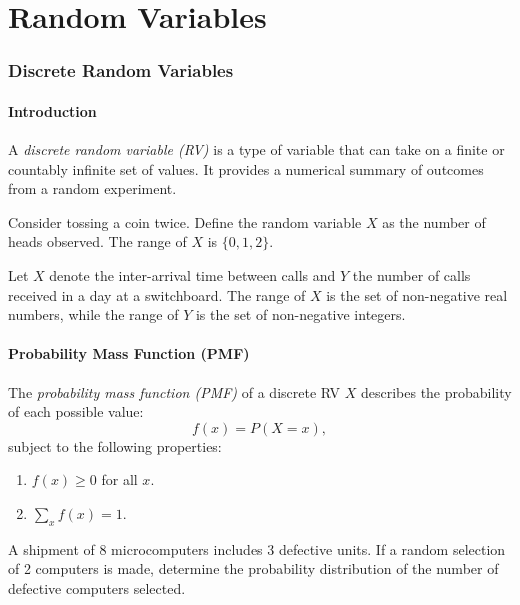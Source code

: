 \documentclass{article}
\begin{document}
\part{Random Variables}

\section{Discrete Random Variables}

\subsection{Introduction}
A \textit{discrete random variable (RV)} is a type of variable that can take on a finite or countably infinite set of values. It provides a numerical summary of outcomes from a random experiment.

\begin{example}
Consider tossing a coin twice. Define the random variable $X$ as the number of heads observed. The range of $X$ is $\{0, 1, 2\}$.
\end{example}

\begin{example}
Let $X$ denote the inter-arrival time between calls and $Y$ the number of calls received in a day at a switchboard. The range of $X$ is the set of non-negative real numbers, while the range of $Y$ is the set of non-negative integers.
\end{example}

\subsection{Probability Mass Function (PMF)}
The \textit{probability mass function (PMF)} of a discrete RV $X$ describes the probability of each possible value:
\[
f(x) = P(X = x),
\]
subject to the following properties:
\begin{enumerate}
    \item $f(x) \geq 0$ for all $x$.
    \item $\sum_x f(x) = 1$.
\end{enumerate}

\begin{example}
A shipment of 8 microcomputers includes 3 defective units. If a random selection of 2 computers is made, determine the probability distribution of the number of defective computers selected.
\end{example}
\end{document}

